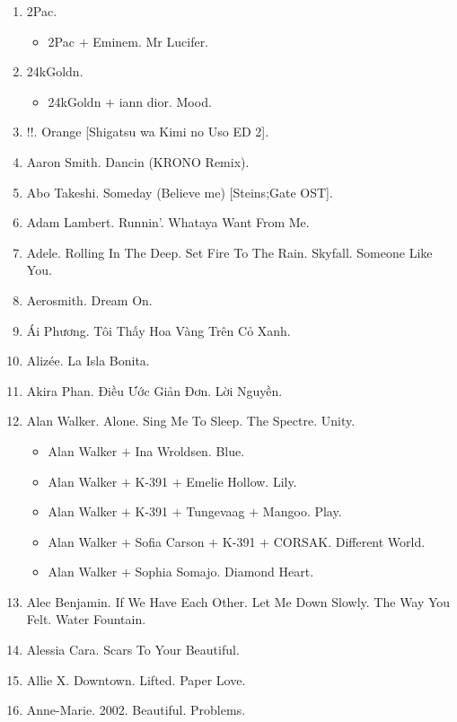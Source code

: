 \documentclass{article}
\begin{document}
\begin{enumerate}
	\item {\sc 2Pac.}
	\begin{itemize}
		\item {\sc 2Pac $+$ Eminem.} Mr Lucifer.
	\end{itemize}
	\item {\sc 24kGoldn.}
	\begin{itemize}
		\item {\sc 24kGoldn $+$ iann dior.} Mood.
	\end{itemize}
	\item {!!.} Orange [Shigatsu wa Kimi no Uso ED 2].
	\item {\sc Aaron Smith.} Dancin (KRONO Remix).
	\item {\sc Abo Takeshi.} Someday (Believe me) [Steins;Gate OST].
	\item {\sc Adam Lambert.} Runnin'. Whataya Want From Me.
	\item {\sc Adele.} Rolling In The Deep. Set Fire To The Rain. Skyfall. Someone Like You.
	\item {\sc Aerosmith.} Dream On.
	\item {\sc Ái Phương.} Tôi Thấy Hoa Vàng Trên Cỏ Xanh.
	\item {\sc Alizée.} La Isla Bonita.
	\item {\sc Akira Phan.} Điều Ước Giản Đơn. Lời Nguyền.
	\item {\sc Alan Walker.} Alone. Sing Me To Sleep. The Spectre. Unity.
	\begin{itemize}
		\item {\sc Alan Walker $+$ Ina Wroldsen.} Blue.
		\item {\sc Alan Walker $+$ K-391 $+$ Emelie Hollow.} Lily.
		\item {\sc Alan Walker $+$ K-391 $+$ Tungevaag $+$ Mangoo.} Play.
		\item {\sc Alan Walker $+$ Sofia Carson $+$ K-391 $+$ CORSAK.} Different World.
		\item {\sc Alan Walker $+$ Sophia Somajo.} Diamond Heart.
	\end{itemize}
	\item {\sc Alec Benjamin.} If We Have Each Other. Let Me Down Slowly. The Way You Felt. Water Fountain.
	\item {\sc Alessia Cara.} Scars To Your Beautiful.
	\item {\sc Allie X.} Downtown. Lifted. Paper Love.
	\item {\sc Anne-Marie.} 2002. Beautiful. Problems.
	\begin{itemize}

\end{itemize}
\end{enumerate}
\end{document}
